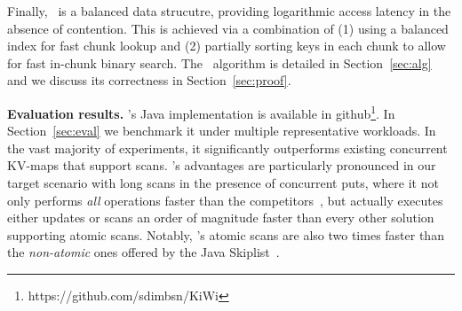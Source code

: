 Finally, \kiwi\ is a balanced data strucutre, providing logarithmic access latency in the absence of contention.
This is achieved via a combination of (1) using a balanced index for fast chunk lookup and (2) partially sorting keys in each
chunk to allow for fast in-chunk binary search. The \kiwi\ algorithm is detailed in Section~\ref{sec:alg}
and we discuss its correctness in Section~\ref{sec:proof}.


{\bf{Evaluation results.}}
\kiwi's Java implementation is available in github\footnote{https://github.com/sdimbsn/KiWi}. In Section~\ref{sec:eval} we benchmark it under multiple representative workloads.
In the vast majority of  experiments, it significantly outperforms existing concurrent KV-maps that support scans.
\kiwi's advantages are particularly pronounced in our target scenario with long scans in the presence of concurrent puts, where
it not only performs \emph{all} operations faster than the competitors~\cite{BrownA12,BronsonCCO2010},
but actually executes either updates or scans an order of magnitude faster than every other solution supporting atomic scans.
Notably, \kiwi's atomic scans are also two times faster than the \emph{non-atomic}
ones offered by the Java Skiplist~\cite{JavaConcurrentSkipList}. 


